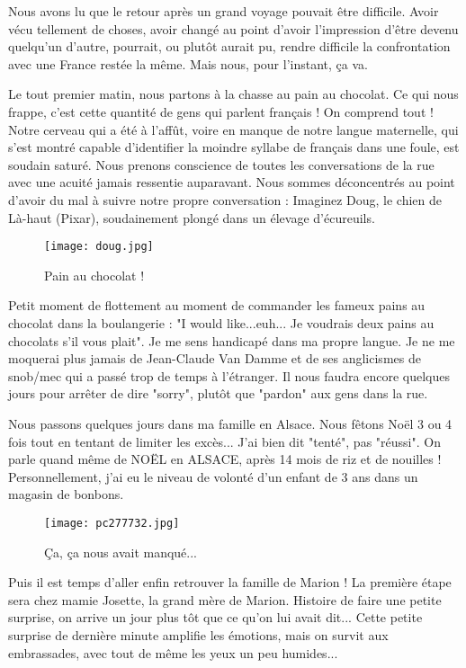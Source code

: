 \documentclass{book}
\begin{document}
Nous avons lu que le retour après un grand voyage pouvait être difficile. Avoir vécu tellement de choses, avoir changé au point d'avoir l'impression d'être devenu quelqu'un d'autre, pourrait, ou plutôt aurait pu, rendre difficile la confrontation avec une France restée la même. Mais nous, pour l'instant, ça va.

Le tout premier matin, nous partons à la chasse au pain au chocolat. Ce qui nous frappe, c'est cette quantité de gens qui parlent français ! On comprend tout ! Notre cerveau qui a été à l’affût, voire en manque de notre langue maternelle, qui s'est montré capable d'identifier la moindre syllabe de français dans une foule, est soudain saturé. Nous prenons conscience de toutes les conversations de la rue avec une acuité jamais ressentie auparavant. Nous sommes déconcentrés au point d'avoir du mal à suivre notre propre conversation : Imaginez Doug, le chien de Là-haut (Pixar), soudainement plongé dans un élevage d'écureuils.


\begin{figure}[h]
\centering
\texttt{[image: doug.jpg]}
\caption*{Pain au chocolat !}
\end{figure}

Petit moment de flottement au moment de commander les fameux pains au chocolat dans la boulangerie : "I would like...euh... Je voudrais deux pains au chocolats s'il vous plait". Je me sens handicapé dans ma propre langue. Je ne me moquerai plus jamais de Jean-Claude Van Damme et de ses anglicismes de snob/mec qui a passé trop de temps à l'étranger. Il nous faudra encore quelques jours pour arrêter de dire "sorry", plutôt que "pardon" aux gens dans la rue.

Nous passons quelques jours dans ma famille en Alsace. Nous fêtons Noël 3 ou 4 fois tout en tentant de limiter les excès... J'ai bien dit "tenté", pas "réussi". On parle quand même de NOËL en ALSACE, après 14 mois de riz et de nouilles ! Personnellement, j'ai eu le niveau de volonté d'un enfant de 3 ans dans un magasin de bonbons.


\begin{figure}[h]
\centering
\texttt{[image: pc277732.jpg]}
\caption*{Ça, ça nous avait manqué...}
\end{figure}

Puis il est temps d'aller enfin retrouver la famille de Marion ! La première étape sera chez mamie Josette, la grand mère de Marion. Histoire de faire une petite surprise, on arrive un jour plus tôt que ce qu'on lui avait dit... Cette petite surprise de dernière minute amplifie les émotions, mais on survit aux embrassades, avec tout de même les yeux un peu humides...
\end{document}
